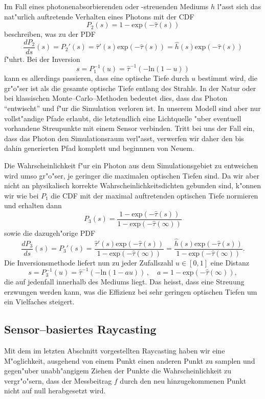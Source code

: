 	Im Fall eines photonenabsorbierenden oder -streuenden Mediums $h$ l"asst sich das nat"urlich auftretende Verhalten eines Photons mit der CDF
	$$P_2(s)=1-\text{exp}(-{\hat \tau}(s))$$
	beschreiben, was zu der PDF
	$$\frac{dP_2}{ds}(s)=P_2'(s)={\hat \tau}'(s)\text{exp}(-{\hat \tau}(s))={\hat h}(s)\text{exp}(-{\hat \tau}(s))$$
	f"uhrt. Bei der Inversion
	$$s=P_1^{-1}(u)={\hat \tau}^{-1}\left(-\text{ln}(1-u)\right)$$
	kann es allerdings passieren, dass eine optische Tiefe durch $u$ bestimmt wird, die gr"o"ser ist als die gesamte optische Tiefe entlang des Strahls. In der Natur oder bei klassischen Monte--Carlo--Methoden bedeutet dies, dass das Photon ``entwischt'' und f"ur die Simulation verloren ist. In unserem Modell sind aber nur vollst"andige Pfade erlaubt, die letztendlich eine Lichtquelle "uber eventuell vorhandene Streupunkte mit einem Sensor verbinden. Tritt bei uns der Fall ein, dass das Photon den Simulationsraum verl"asst, verwerfen wir daher den bis dahin generierten Pfad komplett und beginnnen von Neuem.
	
	Die Wahrscheinlichkeit f"ur ein Photon aus dem Simulationsgebiet zu entweichen wird umso gr"o"ser, je geringer die maximalen optischen Tiefen sind. Da wir aber nicht an physikalisch korrekte Wahrscheinlichkeitsdichten gebunden sind, k"onnen wir wie bei $P_1$ die CDF mit der maximal auftretenden optischen Tiefe normieren und erhalten dann
	$$P_3(s)=\frac{1-\text{exp}(-{\hat \tau}(s))}{1-\text{exp}(-{\hat \tau}(\infty))}$$
	sowie die dazugeh"orige PDF
	$$\frac{dP_3}{ds}(s)=P_3'(s)=\frac{{\hat \tau}'(s)\text{exp}(-{\hat \tau}(s))}{1-\text{exp}(-{\hat \tau}(\infty))}=\frac{{\hat h}(s)\text{exp}(-{\hat \tau}(s))}{1-\text{exp}(-{\hat \tau}(\infty))}.$$
	Die Inversionsmethode liefert nun zu jeder Zufallszahl $u\in[0,1]$ eine Distanz
	\begin{equation}
    s=P_3^{-1}(u)={\hat \tau}^{-1}\left(-\text{ln}(1-a u)\right)\,,\quad a=1-\text{exp}(-{\hat \tau}(\infty)),
    \label{eq:enforced_scattering_distancesampler}
	\end{equation}
	die auf jedenfall innerhalb des Mediums liegt. Das heisst, dass eine Streuung erzwungen werden kann, was die Effizienz bei sehr geringen optischen Tiefen um ein Vielfaches steigert.
	
	\subsection{Sensor--basiertes Raycasting}\label{subsec:sensor_based_raycasting}
	Mit dem im letzten Abschnitt vorgestellten Raycasting haben wir eine M"oglichkeit, ausgehend von einem Punkt einen anderen Punkt zu samplen und gegen"uber unabh"angigem Ziehen der Punkte die Wahrscheinlichkeit zu vergr"o"sern, dass der Messbeitrag $f$ durch den neu hinzugekommenen Punkt nicht auf null herabgesetzt wird.
	

